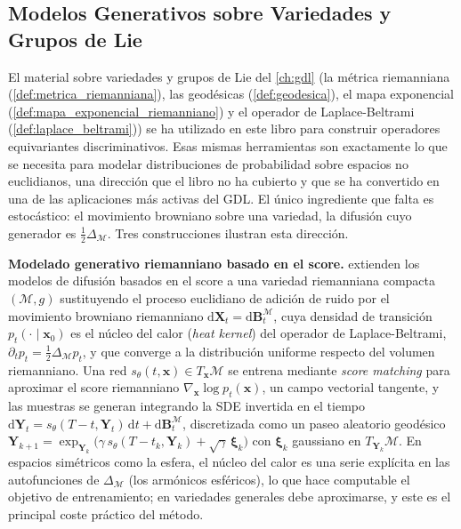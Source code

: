 \subsection{Modelos Generativos sobre Variedades y Grupos de Lie}\label{subsec:modelos_generativos_variedades}

El material sobre variedades y grupos de Lie del \autoref{ch:gdl} (la métrica riemanniana (\autoref{def:metrica_riemanniana}), las geodésicas (\autoref{def:geodesica}), el mapa exponencial (\autoref{def:mapa_exponencial_riemanniano}) y el operador de Laplace-Beltrami (\autoref{def:laplace_beltrami})) se ha utilizado en este libro para construir operadores equivariantes discriminativos. Esas mismas herramientas son exactamente lo que se necesita para modelar distribuciones de probabilidad sobre espacios no euclidianos, una dirección que el libro no ha cubierto y que se ha convertido en una de las aplicaciones más activas del \gls{GDL}. El único ingrediente que falta es estocástico: el movimiento browniano sobre una variedad, la difusión cuyo generador es $\tfrac{1}{2}\Delta_\mathcal{M}$. Tres construcciones ilustran esta dirección.

\textbf{Modelado generativo riemanniano basado en el score.} \citet{debortoli2022riemanniansgm} extienden los modelos de difusión basados en el score a una variedad riemanniana compacta $(\mathcal{M}, g)$ sustituyendo el proceso euclidiano de adición de ruido por el movimiento browniano riemanniano $\mathrm{d}\mathbf{X}_t = \mathrm{d}\mathbf{B}^\mathcal{M}_t$, cuya densidad de transición $p_t(\cdot \mid \mathbf{x}_0)$ es el núcleo del calor (\textit{heat kernel}) del operador de Laplace-Beltrami, $\partial_t p_t = \tfrac{1}{2}\Delta_\mathcal{M} p_t$, y que converge a la distribución uniforme respecto del volumen riemanniano. Una red $s_\theta(t, \mathbf{x}) \in T_\mathbf{x}\mathcal{M}$ se entrena mediante \textit{score matching} para aproximar el score riemanniano $\nabla_\mathbf{x} \log p_t(\mathbf{x})$, un campo vectorial tangente, y las muestras se generan integrando la SDE invertida en el tiempo $\mathrm{d}\mathbf{Y}_t = s_\theta(T - t, \mathbf{Y}_t)\,\mathrm{d}t + \mathrm{d}\mathbf{B}^\mathcal{M}_t$, discretizada como un paseo aleatorio geodésico $\mathbf{Y}_{k+1} = \exp_{\mathbf{Y}_k}\!\big(\gamma\, s_\theta(T - t_k, \mathbf{Y}_k) + \sqrt{\gamma}\,\boldsymbol{\xi}_k\big)$ con $\boldsymbol{\xi}_k$ gaussiano en $T_{\mathbf{Y}_k}\mathcal{M}$. En espacios simétricos como la esfera, el núcleo del calor es una serie explícita en las autofunciones de $\Delta_\mathcal{M}$ (los armónicos esféricos), lo que hace computable el objetivo de entrenamiento; en variedades generales debe aproximarse, y este es el principal coste práctico del método.

